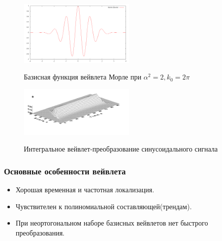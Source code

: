 \documentclass[11pt,slides,aspectratio=43]{beamer}%
\begin{document}
    \begin{frame}
        \begin{figure}[h!]
            \begin{center}
                \includegraphics[width = 0.5\textwidth]{wavelet.png}
            \end{center}
            \begin{center}
                Базисная функция вейвлета Морле при $\alpha^{2} = 2, k_{0} = 2 \pi$
            \end{center}
        \end{figure}
        \begin{figure}[h!]
            \begin{center}
                \includegraphics[width = 0.5\textwidth]{323.png}
            \end{center}
            \begin{center}
                Интегральное вейвлет-преобразование синусоидального сигнала
            \end{center}
        \end{figure}
    \end{frame}

    \begin{frame}
	\frametitle{Основные особенности вейвлета}
	   \begin{block}{}
            \begin{itemize}
	           \item Хорошая временная и частотная локализация.
	           \item Чувствителен к полиномиальной составляющей(трендам).
               \item При неортогональном наборе базисных вейвлетов нет быстрого преобразования.
            \end{itemize}
		\end{block}
	\end{frame}
\end{document}
